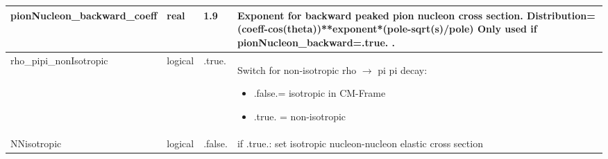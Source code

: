 \documentclass{article}
\begin{document}
\begin{longtable}{llll}
\midrule
pionNucleon\_backward\_coeff & \begin{minipage}[t]{2cm}real\end{minipage} & \begin{minipage}[t]{2cm}1.9\end{minipage} & \begin{minipage}[t]{12cm}Exponent for backward peaked pion nucleon cross section. Distribution=(coeff-cos(theta))**exponent*(pole-sqrt(s)/pole) Only used if pionNucleon\_backward=.true. .\end{minipage}\\*
\midrule
rho\_pipi\_nonIsotropic & \begin{minipage}[t]{2cm}logical\end{minipage} & \begin{minipage}[t]{2cm}.true.\end{minipage} & \begin{minipage}[t]{12cm}Switch for non-isotropic rho $\rightarrow$ pi pi decay:\begin{itemize}\leftmargin0em\itemindent0pt\item .false.= isotropic in CM-Frame\item .true. = non-isotropic\end{itemize}\end{minipage}\\*
\midrule
NNisotropic & \begin{minipage}[t]{2cm}logical\end{minipage} & \begin{minipage}[t]{2cm}.false.\end{minipage} & \begin{minipage}[t]{12cm}if .true.: set isotropic nucleon-nucleon elastic cross section\end{minipage}\\*
\midrule

\end{longtable}
\end{document}
